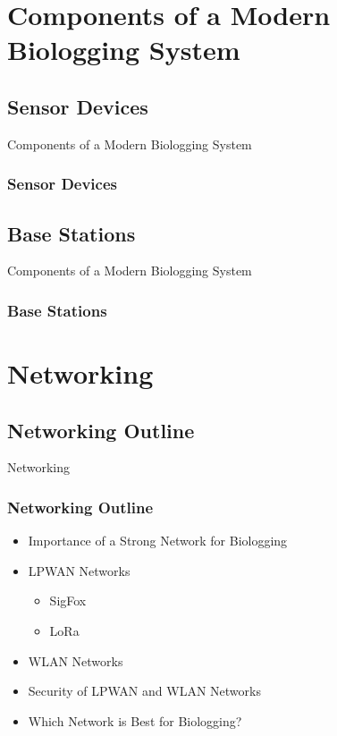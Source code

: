 \documentclass{beamer}
\begin{document}
\section{Components of a Modern Biologging System}

\subsection{Sensor Devices}
  \begin{frame}{Components of a Modern Biologging System}
    \frametitle{Sensor Devices}
  \end{frame}

\subsection{Base Stations}
  \begin{frame}{Components of a Modern Biologging System}
    \frametitle{Base Stations}
  \end{frame}




\section{Networking}

\subsection{Networking Outline}
  \begin{frame}{Networking}
    \frametitle{Networking Outline}
    \begin{itemize}
      \item Importance of a Strong Network for Biologging
      \item LPWAN Networks
      \begin{itemize}
        \item SigFox
        \item LoRa
      \end{itemize}
      \item WLAN Networks
      \item Security of LPWAN and WLAN Networks
      \item Which Network is Best for Biologging?
    \end{itemize}
  \end{frame}
\end{document}
